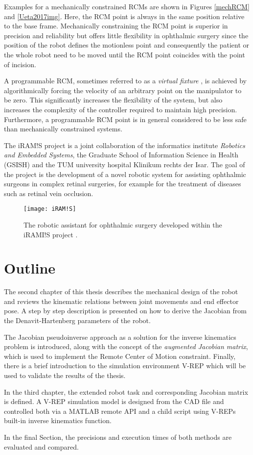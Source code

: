Examples for a mechanically constrained RCMs are shown in Figures \ref{mechRCM} and \ref{Ueta2017img}. Here, the RCM point is always in the same position relative to the base frame. Mechanically constraining the RCM point is superior in precision and reliability but offers little flexibility in ophthalmic surgery since the position of the robot defines the motionless point and consequently the patient or the whole robot need to be moved until the RCM point coincides with the point of incision.

A programmable RCM, sometimes referred to as a \textit{virtual fixture} \cite{MingLi2004}, is achieved by algorithmically forcing the velocity of an arbitrary point on the manipulator to be zero. This significantly increases the flexibility of the system, but also increases the complexity of the controller required to maintain high precision. Furthermore, a programmable RCM point is in general considered to be less safe than mechanically constrained systems.

The iRAM!S project \cite{nasseri2013introduction} is a joint collaboration of the informatics institute \textit{Robotics and Embedded Systems}, the Graduate School of Information Science in Health (GSISH) and the TUM university hospital Klinikum rechts der Isar. The goal of the project is the development of a novel robotic system for assisting ophthalmic surgeons in complex retinal surgeries, for example for the treatment of diseases such as retinal vein occlusion.

\begin{figure}[t!]
	\centering
	\texttt{[image: iRAM!S]}
	\caption{The robotic assistant for ophthalmic surgery developed within the iRAMI!S project \cite{iramis}.}
	\label{iRAM!S}
\end{figure}

\section{Outline}
The second chapter of this thesis describes the mechanical design of the robot and reviews the kinematic relations between joint movements and end effector pose. A step by step description is presented on how to derive the Jacobian from the Denavit-Hartenberg parameters of the robot. 

The Jacobian pseudoinverse approach as a solution for the inverse kinematics problem is introduced, along with the concept of the \textit{augmented Jacobian matrix}, which is used to implement the Remote Center of Motion constraint. Finally, there is a brief introduction to the simulation environment V-REP which will be used to validate the results of the thesis.

In the third chapter, the extended robot task and corresponding Jacobian matrix is defined. A V-REP simulation model is designed from the CAD file and controlled both via a MATLAB remote API and a child script using V-REPs built-in inverse kinematics function. 

In the final Section, the precisions and execution times of both methods are evaluated and compared.